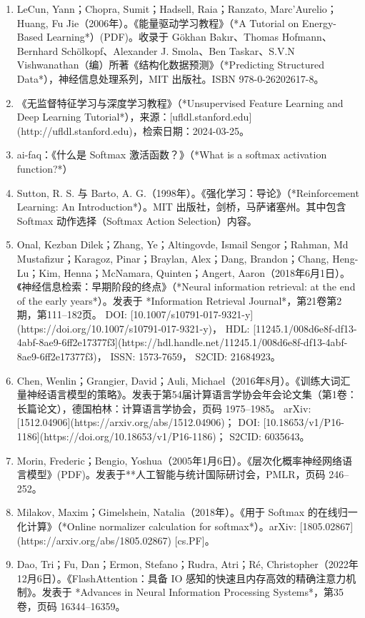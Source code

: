 \begin{enumerate}
\item LeCun, Yann；Chopra, Sumit；Hadsell, Raia；Ranzato, Marc’Aurelio；Huang, Fu Jie（2006年）。《能量驱动学习教程》（*A Tutorial on Energy-Based Learning*）(PDF)。收录于 Gökhan Bakır、Thomas Hofmann、Bernhard Schölkopf、Alexander J. Smola、Ben Taskar、S.V.N Vishwanathan（编）所著《结构化数据预测》（*Predicting Structured Data*），神经信息处理系列，MIT 出版社。ISBN 978-0-26202617-8。
\item 《无监督特征学习与深度学习教程》（*Unsupervised Feature Learning and Deep Learning Tutorial*），来源：[ufldl.stanford.edu](http://ufldl.stanford.edu)，检索日期：2024-03-25。
\item ai-faq：《什么是 Softmax 激活函数？》（*What is a softmax activation function?*）
\item Sutton, R. S. 与 Barto, A. G.（1998年）。《强化学习：导论》（*Reinforcement Learning: An Introduction*）。MIT 出版社，剑桥，马萨诸塞州。其中包含 Softmax 动作选择（Softmax Action Selection）内容。
\item Onal, Kezban Dilek；Zhang, Ye；Altingovde, Ismail Sengor；Rahman, Md Mustafizur；Karagoz, Pinar；Braylan, Alex；Dang, Brandon；Chang, Heng-Lu；Kim, Henna；McNamara, Quinten；Angert, Aaron（2018年6月1日）。《神经信息检索：早期阶段的终点》（*Neural information retrieval: at the end of the early years*）。发表于 *Information Retrieval Journal*，第21卷第2期，第111–182页。
  DOI: [10.1007/s10791-017-9321-y](https://doi.org/10.1007/s10791-017-9321-y)，
  HDL: [11245.1/008d6e8f-df13-4abf-8ae9-6ff2e17377f3](https://hdl.handle.net/11245.1/008d6e8f-df13-4abf-8ae9-6ff2e17377f3)，
  ISSN: 1573-7659，
  S2CID: 21684923。
\item Chen, Wenlin；Grangier, David；Auli, Michael（2016年8月）。《训练大词汇量神经语言模型的策略》。发表于第54届计算语言学协会年会论文集（第1卷：长篇论文），德国柏林：计算语言学协会，页码 1975–1985。
  arXiv: [1512.04906](https://arxiv.org/abs/1512.04906)；
  DOI: [10.18653/v1/P16-1186](https://doi.org/10.18653/v1/P16-1186)；
  S2CID: 6035643。
\item Morin, Frederic；Bengio, Yoshua（2005年1月6日）。《层次化概率神经网络语言模型》(PDF)。发表于**人工智能与统计国际研讨会，PMLR，页码 246–252。
\item Milakov, Maxim；Gimelshein, Natalia（2018年）。《用于 Softmax 的在线归一化计算》（*Online normalizer calculation for softmax*）。arXiv: [1805.02867](https://arxiv.org/abs/1805.02867) [cs.PF]。
\item Dao, Tri；Fu, Dan；Ermon, Stefano；Rudra, Atri；Ré, Christopher（2022年12月6日）。《FlashAttention：具备 IO 感知的快速且内存高效的精确注意力机制》。发表于 *Advances in Neural Information Processing Systems*，第35卷，页码 16344–16359。

\end{enumerate}
